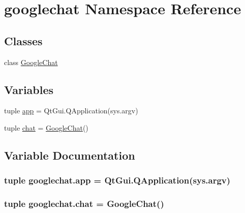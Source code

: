 \hypertarget{namespacegooglechat}{}\section{googlechat Namespace Reference}
\label{namespacegooglechat}
\subsection*{Classes}
\begin{DoxyCompactItemize}
\item 
class \hyperlink{classgooglechat_1_1GoogleChat}{Google\+Chat}
\end{DoxyCompactItemize}
\subsection*{Variables}
\begin{DoxyCompactItemize}
\item 
tuple \hyperlink{namespacegooglechat_a4d1c1645091513dfa2d6b8cd1b5602f5}{app} = Qt\+Gui.\+Q\+Application(sys.\+argv)
\item 
tuple \hyperlink{namespacegooglechat_a149240d0fc9edfce8c93f5b08ba7607e}{chat} = \hyperlink{classgooglechat_1_1GoogleChat}{Google\+Chat}()
\end{DoxyCompactItemize}


\subsection{Variable Documentation}
\hypertarget{namespacegooglechat_a4d1c1645091513dfa2d6b8cd1b5602f5}{}
\subsubsection[{app}]{\setlength{\rightskip}{0pt plus 5cm}tuple googlechat.\+app = Qt\+Gui.\+Q\+Application(sys.\+argv)}\label{namespacegooglechat_a4d1c1645091513dfa2d6b8cd1b5602f5}
\hypertarget{namespacegooglechat_a149240d0fc9edfce8c93f5b08ba7607e}{}
\subsubsection[{chat}]{\setlength{\rightskip}{0pt plus 5cm}tuple googlechat.\+chat = {\bf Google\+Chat}()}\label{namespacegooglechat_a149240d0fc9edfce8c93f5b08ba7607e}
